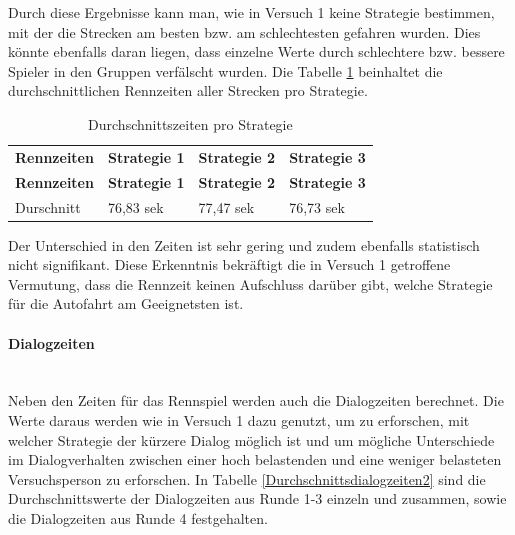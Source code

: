 \documentclass[12pt,a4paper]{scrartcl}
\begin{document}
Durch diese Ergebnisse kann man, wie in Versuch 1 keine Strategie bestimmen, mit der die Strecken am besten bzw. am schlechtesten gefahren wurden.
Dies könnte ebenfalls daran liegen, dass einzelne Werte durch schlechtere bzw. bessere Spieler in den Gruppen verfälscht wurden. Die Tabelle \ref{RennZeitenDis2} beinhaltet die durchschnittlichen Rennzeiten aller Strecken pro Strategie. 

\begin{longtable}{p{3cm}p{3cm}p{3cm}p{3cm} }
	\label{RennZeitenDis2}\\
	\caption[Durchschnittszeiten pro Strategie]{Durchschnittszeiten pro Strategie}\\
	\hline
	\textbf{Rennzeiten}&\textbf{Strategie 1}&\textbf{Strategie 2} &\textbf{Strategie 3}\\
	\hline
	\endfirsthead
	\hline
	\textbf{Rennzeiten}&\textbf{Strategie 1}&\textbf{Strategie 2} &\textbf{Strategie 3}\\
	\hline
	\endhead
Durschnitt & 76,83 sek & 77,47 sek & 76,73 sek \\
\hline
\end{longtable}
Der Unterschied in den Zeiten ist sehr gering und zudem ebenfalls statistisch nicht signifikant. Diese Erkenntnis bekräftigt die in Versuch 1 getroffene Vermutung, dass die Rennzeit keinen Aufschluss darüber gibt, welche Strategie für die Autofahrt am Geeignetsten ist. 

\paragraph{Dialogzeiten}
~\\
Neben den Zeiten für das Rennspiel werden auch die Dialogzeiten berechnet. 
Die Werte daraus werden wie in Versuch 1 dazu genutzt, um zu erforschen, mit welcher Strategie der kürzere Dialog möglich ist und um mögliche Unterschiede im Dialogverhalten zwischen einer hoch belastenden und eine weniger belasteten Versuchsperson zu erforschen. 
In Tabelle \ref{Durchschnittsdialogzeiten2} sind die Durchschnittswerte der Dialogzeiten aus Runde 1-3 einzeln und zusammen, sowie die Dialogzeiten aus Runde 4 festgehalten. 
\end{document}
